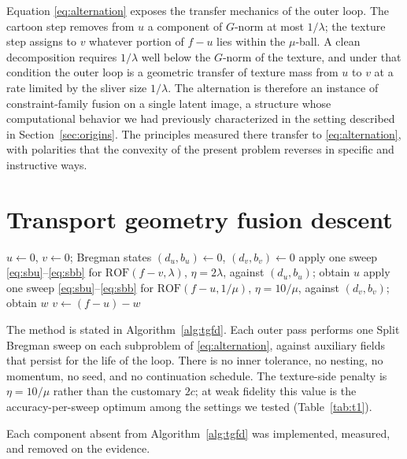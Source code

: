 \documentclass[11pt]{article}
\theoremstyle{definition}
\newcommand{\ROF}{\mathrm{ROF}}
\begin{document}
Equation \eqref{eq:alternation} exposes the transfer mechanics of the outer
loop. The cartoon step removes from $u$ a component of $G$-norm at most
$1/\lambda$; the texture step assigns to $v$ whatever portion of $f-u$ lies
within the $\mu$-ball. A clean decomposition requires $1/\lambda$ well
below the $G$-norm of the texture, and under that condition the outer loop
is a geometric transfer of texture mass from $u$ to $v$ at a rate limited
by the sliver size $1/\lambda$. The alternation is therefore an instance of
constraint-family fusion on a single latent image, a structure whose
computational behavior we had previously characterized in the setting
described in Section~\ref{sec:origins}. The principles measured there
transfer to \eqref{eq:alternation}, with polarities that the convexity of
the present problem reverses in specific and instructive ways.

\section{Transport geometry fusion descent}
\label{sec:method}

\begin{algorithm}[t]
\caption{Transport geometry fusion descent (TGFD)}
\label{alg:tgfd}
\begin{algorithmic}[1]
\State $u\gets 0$, $v\gets 0$; Bregman states $(d_u,b_u)\gets0$, $(d_v,b_v)\gets0$
  \State apply one sweep \eqref{eq:sbu}--\eqref{eq:sbb} for $\ROF(f-v,\lambda)$, $\eta=2\lambda$, against $(d_u,b_u)$; obtain $u$
  \State apply one sweep \eqref{eq:sbu}--\eqref{eq:sbb} for $\ROF(f-u,1/\mu)$, $\eta=10/\mu$, against $(d_v,b_v)$; obtain $w$
  \State $v \gets (f-u)-w$
\EndWhile
\end{algorithmic}
\end{algorithm}

The method is stated in Algorithm~\ref{alg:tgfd}. Each outer pass performs
one Split Bregman sweep on each subproblem of \eqref{eq:alternation},
against auxiliary fields that persist for the life of the loop. There is no
inner tolerance, no nesting, no momentum, no seed, and no continuation
schedule. The texture-side penalty is $\eta=10/\mu$ rather than the
customary $2c$; at weak fidelity this value is the accuracy-per-sweep
optimum among the settings we tested (Table~\ref{tab:t1}).

Each component absent from Algorithm~\ref{alg:tgfd} was implemented,
measured, and removed on the evidence.
\end{document}
